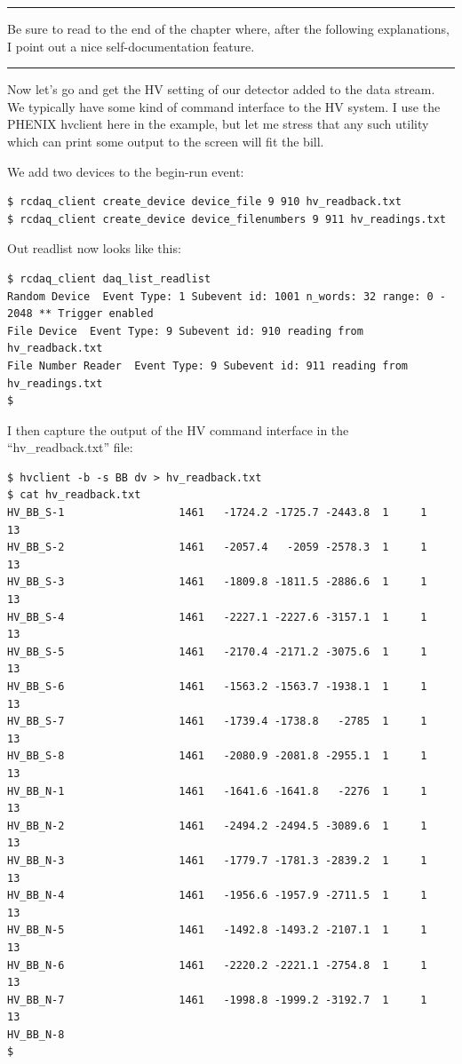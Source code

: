 \documentclass{article}[11pt]
\newcommand{\pointout}[1]{
\vskip 3mm
\begin{minipage}[c]{\linewidth}
\hrule
\vskip 2mm
\begin{minipage}[c]{0.1\linewidth}
{\Huge\color{red}\ding{43}}
\end{minipage}
\begin{minipage}[c]{0.9\linewidth}
#1
\end{minipage}
\vskip 2mm
\hrule
\end{minipage}
\vskip 3mm
}
\begin{document}
\pointout{Be sure to read to the end of the chapter where, after the following
explanations, I point out a nice self-documentation feature.}

Now let's go and get the HV setting of our detector added to the data
stream. We typically have some kind of command interface to the HV
system. I use the PHENIX hvclient here in the example, but let me
stress that any such utility which can print some output to the screen
will fit the bill.

We add two devices to the begin-run event:

\begin{verbatim}
$ rcdaq_client create_device device_file 9 910 hv_readback.txt 
$ rcdaq_client create_device device_filenumbers 9 911 hv_readings.txt
\end{verbatim}

Out readlist now looks like this:

\begin{verbatim}
$ rcdaq_client daq_list_readlist
Random Device  Event Type: 1 Subevent id: 1001 n_words: 32 range: 0 - 2048 ** Trigger enabled
File Device  Event Type: 9 Subevent id: 910 reading from  hv_readback.txt
File Number Reader  Event Type: 9 Subevent id: 911 reading from  hv_readings.txt
$ 
\end{verbatim}


I then capture the output of the HV command interface in the
``hv\_readback.txt'' file:

\begin{verbatim}
$ hvclient -b -s BB dv > hv_readback.txt
$ cat hv_readback.txt
HV_BB_S-1                  1461   -1724.2 -1725.7 -2443.8  1     1    13
HV_BB_S-2                  1461   -2057.4   -2059 -2578.3  1     1    13
HV_BB_S-3                  1461   -1809.8 -1811.5 -2886.6  1     1    13
HV_BB_S-4                  1461   -2227.1 -2227.6 -3157.1  1     1    13
HV_BB_S-5                  1461   -2170.4 -2171.2 -3075.6  1     1    13
HV_BB_S-6                  1461   -1563.2 -1563.7 -1938.1  1     1    13
HV_BB_S-7                  1461   -1739.4 -1738.8   -2785  1     1    13
HV_BB_S-8                  1461   -2080.9 -2081.8 -2955.1  1     1    13
HV_BB_N-1                  1461   -1641.6 -1641.8   -2276  1     1    13
HV_BB_N-2                  1461   -2494.2 -2494.5 -3089.6  1     1    13
HV_BB_N-3                  1461   -1779.7 -1781.3 -2839.2  1     1    13
HV_BB_N-4                  1461   -1956.6 -1957.9 -2711.5  1     1    13
HV_BB_N-5                  1461   -1492.8 -1493.2 -2107.1  1     1    13
HV_BB_N-6                  1461   -2220.2 -2221.1 -2754.8  1     1    13
HV_BB_N-7                  1461   -1998.8 -1999.2 -3192.7  1     1    13
HV_BB_N-8     
$
\end{verbatim}
\end{document}
